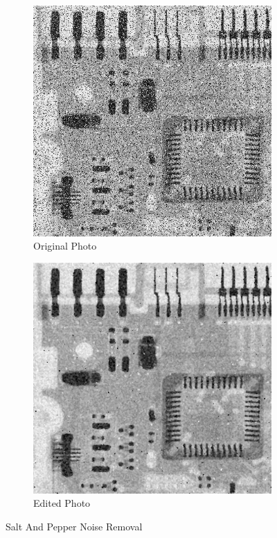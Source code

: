 \documentclass[a4paper]{article}
\begin{document}
\begin{itemize}
    \begin{figure}[h!]
        \centering
        \begin{subfigure}[b]{0.4\linewidth}
            \centering
            \includegraphics[width=\linewidth]{Pictures/Salt And Pepper/4.png}
            \caption{Original Photo}
        \end{subfigure}
        \begin{subfigure}[b]{0.4\linewidth}
            \centering
            \includegraphics[width=\linewidth]{Pictures/Salt And Pepper/open_source_algo.png}
            \caption{Edited Photo}
        \end{subfigure}
        \caption{Salt And Pepper Noise Removal}
        \label{fig:Salt And Pepper}
    \end{figure}


\end{itemize}
\end{document}
